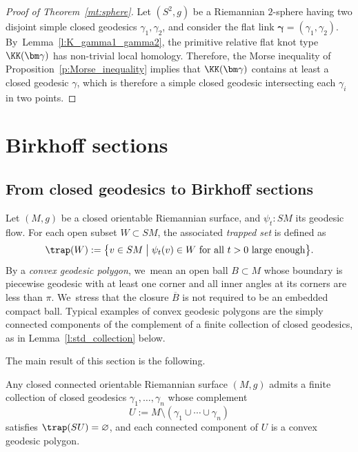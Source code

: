 \begin{proof}[Proof of Theorem~\ref{mt:sphere}]
Let $(S^2,g)$ be a Riemannian $2$-sphere having two disjoint simple closed geodesics $\gamma_1,\gamma_2$, and consider the flat link $\bm\gamma=(\gamma_1,\gamma_2)$. By~Lemma~\ref{l:K_gamma1_gamma2}, the primitive relative flat knot type $\KK(\bm\gamma)$ has non-trivial local homology. Therefore, the Morse inequality of Proposition~\ref{p:Morse_inequality} implies that $\KK(\bm\gamma)$ contains at least a closed geodesic $\gamma$, which is therefore a simple closed geodesic intersecting each $\gamma_i$ in two points.
\end{proof}

\section{Birkhoff sections}
\label{s:Birkhoff_sections}

\subsection{From closed geodesics to Birkhoff sections}

Let $(M,g)$ be a closed orientable Riemannian surface, and $\psi_t:SM$ its geodesic flow. For each open subset $W\subset SM$, the associated \emph{trapped set} is defined as
\begin{align*}
\trap(W) := \bigl\{v\in SM\bigm| \psi_t(v)\in W\mbox{ for all $t>0$ large enough} \bigr\}.
\end{align*}
By a \emph{convex geodesic polygon}, we~mean an open ball $B\subset M$ whose boundary is piecewise geodesic with at least one corner and all inner angles at its corners are less than $\pi$. We~stress that the closure $\overline B$ is not required to be an embedded compact ball. Typical examples of convex geodesic polygons are the simply connected components of the complement of a finite collection of closed geodesics, as in Lemma~\ref{l:std_collection} below.

The main result of this section is the following.

\begin{Thm}\label{t:complete_system}
Any closed connected orientable Riemannian surface $(M,g)$ admits a finite collection of closed geodesics $\gamma_1,\dots,\gamma_n$ whose complement
\[
U:=M\setminus(\gamma_1\cup\cdots\cup\gamma_n)
\]
satisfies $\trap(SU)=\varnothing$, and each connected component of $U$ is a convex geodesic polygon.
\end{Thm}

